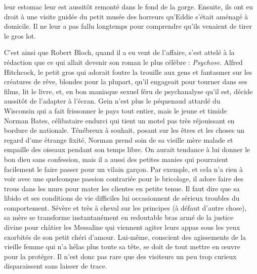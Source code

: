 leur estomac leur est aussitôt remonté dans le fond de la gorge. Ensuite, ils ont eu droit à une visite guidée du petit musée des horreurs qu’Eddie s’était aménagé à domicile. Il ne leur a pas fallu longtemps pour comprendre qu’ils venaient de tirer le gros lot.

C’est ainsi que Robert Bloch, quand il a eu vent de l’affaire, s’est attelé à la rédaction que ce qui allait devenir son roman le plus célèbre : \textit{Psychose}. Alfred Hitchcock, le petit gros qui adorait foutre la trouille aux gens et fantasmer sur les créatures de rêve, blondes pour la plupart, qu’il engageait pour tourner dans ses films, lit le livre, et, en bon maniaque sexuel féru de psychanalyse qu’il est, décide aussitôt de l’adapter à l’écran. Gein n’est plus le péquenaud attardé du Wisconsin qui a fait frissonner le pays tout entier, mais le jeune et timide Norman Bates, célibataire endurci qui tient un motel pas très réjouissant en bordure de nationale. Ténébreux à souhait, posant sur les êtres et les choses un regard d’une étrange fixité, Norman prend soin de sa vieille mère malade et empaille des oiseaux pendant son temps libre. On aurait tendance à lui donner le bon dieu sans confession, mais il a aussi des petites manies qui pourraient facilement le faire passer pour un vilain garçon. Par exemple, et cela n’a rien à voir avec une quelconque passion contrariée pour le bricolage, il adore faire des trous dans les murs pour mater les clientes en petite tenue. Il faut dire que sa libido et ses conditions de vie difficiles lui occasionnent de sérieux troubles du comportement. Sévère et très à cheval sur les principes (à défaut d’autre chose), sa mère se transforme instantanément en redoutable bras armé de la justice divine pour châtier les Messaline qui viennent agiter leurs appas sous les yeux exorbités de son petit chéri d’amour. Lui-même, conscient des agissements de la vieille femme qui n’a hélas plus toute sa tête, se doit de tout mettre en œuvre pour la protéger. Il n’est donc pas rare que des visiteurs un peu trop curieux disparaissent sans laisser de trace.


